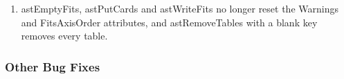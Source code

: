 \documentclass[twoside,11pt]{starlink}
\begin{document}
\begin{enumerate}
\begin{itemize}
  \item a celestial axis without a partner is rejected with an error that says what is wrong;
  \item a -LOG axis with a zero CRVAL no longer crashes, and a -TAB description with a single tabular celestial axis is handled;
  \item a FITS-CLASS header with no CRVAL uses zero rather than an uninitialised value;
  \item CONTINUE cards and complex values are converted correctly, and column definitions read into a FitsTable are correct.
  \end{itemize}
\item astEmptyFits, astPutCards and astWriteFits no longer reset the Warnings and FitsAxisOrder attributes, and astRemoveTables with a blank key removes every table.
\end{enumerate}

\subsubsection{Other Bug Fixes}
\end{document}
